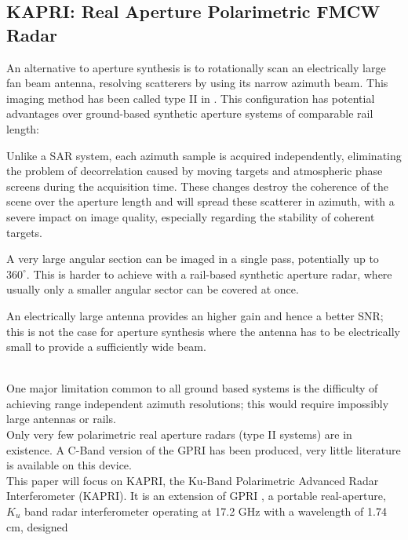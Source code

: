 \subsection{KAPRI: Real Aperture Polarimetric FMCW Radar}
An alternative to aperture synthesis is to rotationally scan an electrically large fan beam antenna, resolving  scatterers by using its narrow azimuth beam\cite{Werner2008}. This imaging method has been called type II in \cite{Caduff2015}. 
This configuration has potential advantages over ground-based synthetic aperture systems\cite{Monserrat2014} of comparable rail length: \begin{enumerate*}
  \item Unlike a SAR system, each azimuth sample is 
acquired independently, eliminating the problem of decorrelation caused by moving targets and atmospheric phase screens during the acquisition time. 
These changes destroy the coherence of the scene over the aperture length and will spread these scatterer in azimuth, with a severe impact on image quality, especially regarding the stability of coherent targets.\\
 \item A very large 
angular section can be imaged in a single pass, potentially up to $360^{\circ}$. This is harder to achieve with a rail-based synthetic aperture radar, where usually only a smaller angular sector
can be covered at once.\\
\item An electrically large antenna provides an higher gain and hence a better SNR; this is not the case for  aperture synthesis  where the antenna has to be electrically small to provide a sufficiently wide beam.\\
\end{enumerate*}\\
One major limitation common to all ground based systems is the difficulty of achieving range independent azimuth resolutions; this would require impossibly large antennas or rails.\\
Only very few polarimetric real aperture radars (type II systems) are in existence. A C-Band version of the GPRI has been produced\cite{Cherukumilli2012}, very little literature is available on this device.\\ This paper will focus on KAPRI, the Ku-Band Polarimetric Advanced Radar Interferometer (KAPRI). It is an extension of GPRI \cite{werner_gpri_2012,Strozzi2011, Werner2008}, a portable real-aperture, $K_u$ band radar interferometer operating at 17.2 GHz with a wavelength of 1.74 cm, designed 
